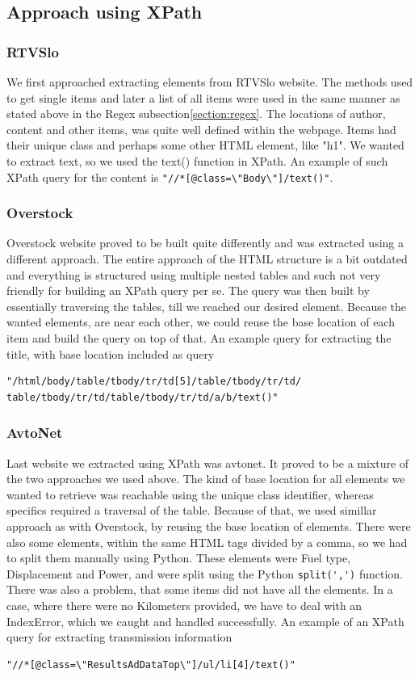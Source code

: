 \documentclass[9pt]{IEEEtran}
\begin{document}
\subsection{Approach using XPath}
\label{section:XPath}
\subsubsection{RTVSlo}
We first approached extracting elements from RTVSlo website. The methods used to get single items and later a list of all items were used in the same manner as stated above in the Regex subsection\ref{section:regex}. The locations of author, content and other items, was quite well defined within the webpage. Items had their unique class and perhaps some other HTML element, like "h1". We wanted to extract text, so we used the text() function in XPath. An example of such XPath query for the content is 
\verb|"//*[@class=\"Body\"]/text()"|.
\subsubsection{Overstock}
Overstock website proved to be built quite differently and was extracted using a different approach. 
The entire approach of the HTML structure is a bit outdated and everything is structured using multiple nested tables and such not very friendly for building an XPath query per se. 
The query was then built by essentially traversing the tables, till we reached our desired element. 
Because the wanted elements, are near each other, we could reuse the base location of each item and build the query on top of that. 
An example query for extracting the title, with base location included as query
\begin{verbatim}
"/html/body/table/tbody/tr/td[5]/table/tbody/tr/td/
table/tbody/tr/td/table/tbody/tr/td/a/b/text()"
\end{verbatim}

\subsubsection{AvtoNet}
Last website we extracted using XPath was avtonet. It proved to be a mixture of the two approaches we used above. The kind of base location for all elements we wanted to retrieve was reachable using the unique class identifier, whereas specifics required a traversal of the table. 
Because of that, we used simillar approach as with Overstock, by reusing the base location of elements.
There were also some elements, within the same HTML tags divided by a comma, so we had to split them manually using Python.
These elements were Fuel type, Displacement and Power, and were split using the Python \verb/split(',')/ function. 
There was also a problem, that some items did not have all the elements. In a case, where there were no Kilometers provided, we have to deal with an IndexError, which we caught and handled successfully. 
An example of an XPath query for extracting transmission information
\begin{verbatim}
"//*[@class=\"ResultsAdDataTop\"]/ul/li[4]/text()"
\end{verbatim}
\end{document}
